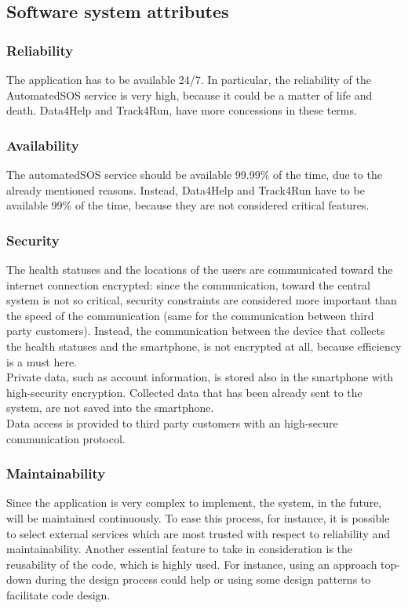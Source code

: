 \subsection{Software system attributes}
\subsubsection{Reliability}
The application has to be available 24/7. In particular, the reliability of the AutomatedSOS service is very high, because it could be a matter of life and death. Data4Help and Track4Run, have more concessions in these terms.

\subsubsection{Availability}
The automatedSOS service should be available 99.99\% of the time, due to the already mentioned reasons. Instead, Data4Help and Track4Run have to be available 99\% of the time, because they are not considered critical features.  

\subsubsection{Security}
The health statuses and the locations of the users are communicated toward the internet connection encrypted: since the communication, toward the central system is not so critical, security constraints are considered more important than the speed of the communication (same for the communication between third party customers). Instead, the communication between the device that collects the health statuses and the smartphone, is not encrypted at all, because efficiency is a must here. \\ 
Private data, such as account information, is stored also in the smartphone with high-security encryption. Collected data that has been already sent to the system, are not saved into the smartphone. \\
Data access is provided to third party customers with an high-secure communication protocol.

\subsubsection{Maintainability}
Since the application is very complex to implement, the system, in the future, will be maintained continuously. To ease this process, for instance, it is possible to select external services which are most trusted with respect to reliability and maintainability. Another essential feature to take in consideration is the reusability of the code, which is highly used. For instance, using an approach top-down during the design process could help or using some design patterns to facilitate code design.

